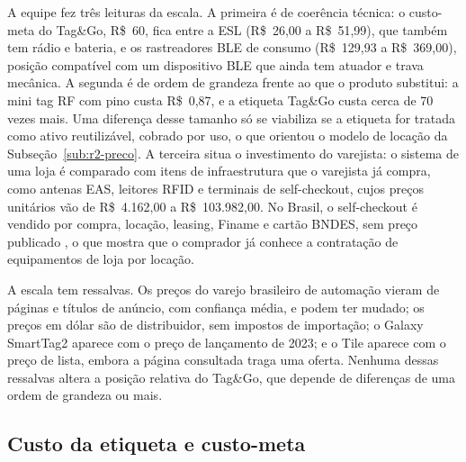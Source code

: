\begin{figure}[htbp]
\end{figure}

A equipe fez três leituras da escala. A primeira é de coerência técnica: o custo-meta do Tag\&Go, R\$~60, fica entre a ESL (R\$~26,00 a R\$~51,99), que também tem rádio e bateria, e os rastreadores BLE de consumo (R\$~129,93 a R\$~369,00), posição compatível com um dispositivo BLE que ainda tem atuador e trava mecânica. A segunda é de ordem de grandeza frente ao que o produto substitui: a mini tag RF com pino custa R\$~0,87, e a etiqueta Tag\&Go custa cerca de 70 vezes mais. Uma diferença desse tamanho só se viabiliza se a etiqueta for tratada como ativo reutilizável, cobrado por uso, o que orientou o modelo de locação da Subseção~\ref{sub:r2-preco}. A terceira situa o investimento do varejista: o sistema de uma loja é comparado com itens de infraestrutura que o varejista já compra, como antenas EAS, leitores RFID e terminais de self-checkout, cujos preços unitários vão de R\$~4.162,00 a R\$~103.982,00. No Brasil, o self-checkout é vendido por compra, locação, leasing, Finame e cartão BNDES, sem preço publicado \cite{perto2021selfcheckout}, o que mostra que o comprador já conhece a contratação de equipamentos de loja por locação.

A escala tem ressalvas. Os preços do varejo brasileiro de automação vieram de páginas e títulos de anúncio, com confiança média, e podem ter mudado; os preços em dólar são de distribuidor, sem impostos de importação; o Galaxy SmartTag2 aparece com o preço de lançamento de 2023; e o Tile aparece com o preço de lista, embora a página consultada traga uma oferta. Nenhuma dessas ressalvas altera a posição relativa do Tag\&Go, que depende de diferenças de uma ordem de grandeza ou mais.

\subsection{Custo da etiqueta e custo-meta}
\label{sub:r2-custo-meta}

